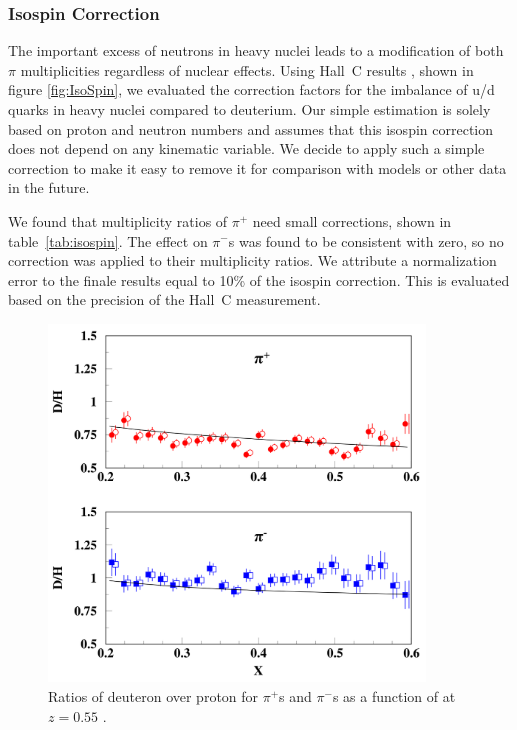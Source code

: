 \subsubsection{Isospin Correction}

The important excess of neutrons in heavy nuclei leads to a modification of 
both $\pi$ multiplicities regardless of nuclear effects. Using Hall~C results 
\cite{Asaturyan:2011mq}, shown in figure \ref{fig:IsoSpin}, we evaluated the 
correction factors for the imbalance of u/d quarks in heavy nuclei compared
to deuterium. Our simple estimation is solely based on proton and neutron 
numbers and assumes that this isospin correction does not depend on any
kinematic variable. We decide to apply such a simple correction to make it easy
to remove it for comparison with models or other data in the future.

We found that multiplicity ratios of $\pi^+$ need small
corrections, shown in table~\ref{tab:isospin}. The effect on $\pi^-$s was 
found to be consistent with zero, so no correction was applied to their 
multiplicity ratios. We attribute a normalization error to the finale results
equal to 10\% of the isospin correction. This is evaluated based on the 
precision of the Hall~C measurement.

\begin{figure}[tbp]
\centering
\includegraphics[width=10cm] {chap5-fig/HallC-Isospin.png}
\caption {Ratios of deuteron over proton for $\pi^+$s and $\pi^-$s 
as a function of \xb at $z=0.55$ \cite{Asaturyan:2011mq}.}
\label{fig:RCexample}
\end{figure}

